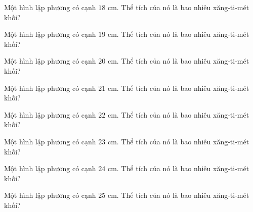 \begin{ex}
  Một hình lập phương có cạnh $18\text{ cm}$. Thể tích của nó là bao nhiêu xăng-ti-mét khối?
\end{ex}

\begin{ex}
  Một hình lập phương có cạnh $19\text{ cm}$. Thể tích của nó là bao nhiêu xăng-ti-mét khối?
\end{ex}

\begin{ex}
  Một hình lập phương có cạnh $20\text{ cm}$. Thể tích của nó là bao nhiêu xăng-ti-mét khối?
\end{ex}

\begin{ex}
  Một hình lập phương có cạnh $21\text{ cm}$. Thể tích của nó là bao nhiêu xăng-ti-mét khối?
\end{ex}

\begin{ex}
  Một hình lập phương có cạnh $22\text{ cm}$. Thể tích của nó là bao nhiêu xăng-ti-mét khối?
\end{ex}

\begin{ex}
  Một hình lập phương có cạnh $23\text{ cm}$. Thể tích của nó là bao nhiêu xăng-ti-mét khối?
\end{ex}

\begin{ex}
  Một hình lập phương có cạnh $24\text{ cm}$. Thể tích của nó là bao nhiêu xăng-ti-mét khối?
\end{ex}

\begin{ex}
  Một hình lập phương có cạnh $25\text{ cm}$. Thể tích của nó là bao nhiêu xăng-ti-mét khối?
\end{ex}

